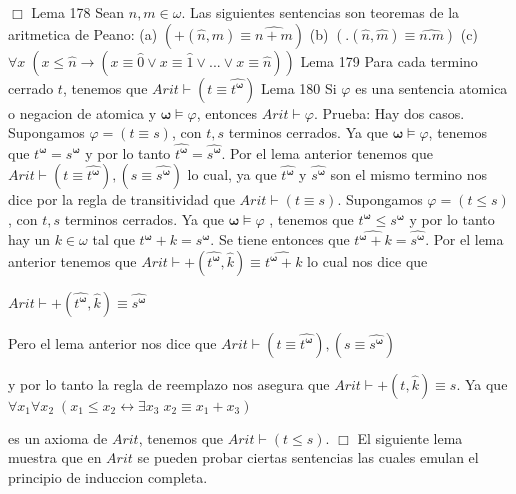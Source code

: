 \(\Box\)
Lema 178 Sean \(n,m\in \omega \). Las siguientes sentencias son teoremas de la aritmetica de Peano:
(a) \((+(\widehat{n},\widehat{m})\equiv \widehat{n+m})\)
(b) \((.(\widehat{n},\widehat{m})\equiv \widehat{n.m})\)
(c) \(\forall x\;(x\leq \widehat{n}\rightarrow (x\equiv \widehat{0} \vee x\equiv \widehat{1}\vee ...\vee x\equiv \widehat{n}))\)
Lema 179 Para cada termino cerrado \(t\), tenemos que \(Arit\vdash (t\equiv \widehat{t^{ \mathbf{\omega }}})\)
Lema 180 Si \(\varphi \) es una sentencia atomica o negacion de atomica y \(\mathbf{ \omega }\models \varphi \), entonces \(Arit\vdash \varphi \).
Prueba: Hay dos casos. Supongamos \(\varphi =(t\equiv s)\), con \(t,s\) terminos cerrados. Ya que \(\mathbf{\omega }\models \varphi \), tenemos que \(t^{\mathbf{ \omega }}=s^{\mathbf{\omega }}\) y por lo tanto \(\widehat{t^{\mathbf{\omega }} }=\widehat{s^{\mathbf{\omega }}}\). Por el lema anterior tenemos que \( Arit\vdash (t\equiv \widehat{t^{\mathbf{\omega }}}),(s\equiv \widehat{s^{ \mathbf{\omega }}})\) lo cual, ya que \(\widehat{t^{\mathbf{\omega }}}\) y \( \widehat{s^{\mathbf{\omega }}}\) son el mismo termino nos dice por la regla de transitividad que \(Arit\vdash (t\equiv s)\). Supongamos \(\varphi =(t\leq s) \), con \(t,s\) terminos cerrados. Ya que \(\mathbf{\omega }\models \varphi \) , tenemos que \(t^{\mathbf{\omega }}\leq s^{\mathbf{\omega }}\) y por lo tanto hay un \(k\in \omega \) tal que \(t^{\mathbf{\omega }}+k=s^{\mathbf{\omega }}\). Se tiene entonces que \(\widehat{t^{\mathbf{\omega }}+k}=\widehat{s^{\mathbf{ \omega }}}\). Por el lema anterior tenemos que \(Arit\vdash +(\widehat{t^{ \mathbf{\omega }}},\widehat{k})\equiv \widehat{t^{\mathbf{\omega }}+k}\) lo cual nos dice que

\(\displaystyle Arit\vdash +(\widehat{t^{\mathbf{\omega }}},\widehat{k})\equiv \widehat{s^{ \mathbf{\omega }}} \)

Pero el lema anterior nos dice que
\(\displaystyle Arit\vdash (t\equiv \widehat{t^{\mathbf{\omega }}}),(s\equiv \widehat{s^{ \mathbf{\omega }}}) \)

y por lo tanto la regla de reemplazo nos asegura que \(Arit\vdash +(t, \widehat{k})\equiv s\). Ya que
\(\displaystyle \forall x_{1}\forall x_{2}\;(x_{1}\leq x_{2}\leftrightarrow \exists x_{3}\;x_{2}\equiv x_{1}+x_{3}) \)

es un axioma de \(Arit\), tenemos que \(Arit\vdash (t\leq s)\). \(\Box\)
El siguiente lema muestra que en \(Arit\) se pueden probar ciertas sentencias las cuales emulan el principio de induccion completa.

